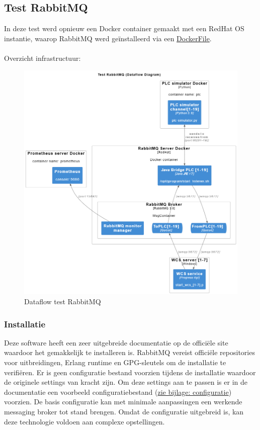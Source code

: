 \newpage
\subsection{Test RabbitMQ}
In deze test werd opnieuw een Docker container gemaakt met een RedHat OS instantie, waarop RabbitMQ 
werd geïnstalleerd via een \hyperref[listing:docker_rabbitmq]{DockerFile}.
\\\\
Overzicht infrastructuur:
\begin{figure}[!h]
  \centering
  \includegraphics[width=.80\textwidth]{img/test-rabbitmq-dataflow.png}
  \caption{\label{fig:test_rabbitmq_dataflow}Dataflow test RabbitMQ}
\end{figure}

\subsubsection{Installatie}
Deze software heeft een zeer uitgebreide documentatie op de officiële site waardoor het gemakkelijk te installeren is.
RabbitMQ vereist officiële repositories voor uitbreidingen, Erlang runtime en GPG-sleutels om de installatie te verifiëren.
Er is geen configuratie bestand voorzien tijdens de installatie waardoor de originele settings van kracht zijn.
Om deze settings aan te passen is er in de documentatie een voorbeeld configuratiebestand (\hyperref[sec:config_rabbitmq]{zie bijlage: configuratie}) voorzien.
De basis configuratie kan met minimale aanpassingen een werkende messaging broker tot stand brengen.
Omdat de configuratie uitgebreid is, kan deze technologie voldoen aan complexe opstellingen.

